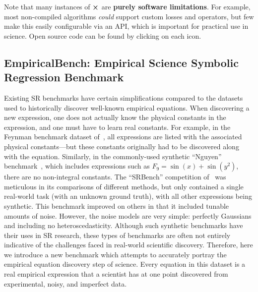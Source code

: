 \documentclass[letterpaper,twocolumn]{scrartcl}
\newcommand\we{we\xspace}
\newcommand\sr{SR\xspace}
\begin{document}
\onecolumn
\begin{landscape}
\begin{table*} \centering
    \scriptsize
{}
    \caption{Note that many instances of {\color{red}$\cross$} are \textbf{purely software limitations}. For example, most non-compiled algorithms \textit{could} support custom losses and operators, but few make this easily configurable via an API, which is important for practical use in science. Open source code can be found by clicking on each \href{https://github.com/MilesCranmer/PySR}{\faUnlock\xspace} icon.
    }
    \label{tbl:comparison_table}
\end{table*}
\end{landscape}
\twocolumn


\newcommand\fullbench{Empirical Science Symbolic Regression Benchmark\xspace}
\newcommand\bench{EmpiricalBench\xspace}

\subsection{\bench: \fullbench}
\label{sec:new_benchmark}

Existing \sr benchmarks have certain simplifications compared to the datasets used to historically discover well-known empirical equations.
When discovering a new expression, one does not actually know the physical constants in the expression, and one must have to learn real constants.
For example, in the Feynman benchmark dataset of~\cite{udrescuAIFeynmanPhysicsinspired2020}, all expressions are listed with the associated physical constants---but these constants originally had to be discovered along with the equation.
Similarly, in the commonly-used synthetic ``Nguyen'' benchmark~\cite{nguyenquanguySemanticallybasedCrossoverGenetic2011}, which includes expressions such as $F_9=\sin(x)+\sin(y^2)$, there are no non-integral constants.
The ``SRBench'' competition of~\cite{defrancaInterpretableSymbolicRegression2023} was meticulous in its comparisons of different methods, but only contained a single real-world task (with an unknown ground truth), with all other expressions being synthetic.
This benchmark improved on others in that it included tunable amounts of noise.
However, the noise models are very simple: perfectly Gaussians and including no heteroscedasticity.
Although such synthetic benchmarks have their uses in \sr research, these types of benchmarks are often not entirely indicative of the challenges faced in real-world scientific discovery.
Therefore, here \we introduce a new benchmark which attempts to accurately portray the empirical equation discovery step of science.
Every equation in this dataset is a real empirical expression that a scientist has at one point discovered from experimental, noisy, and imperfect data.
\end{document}
